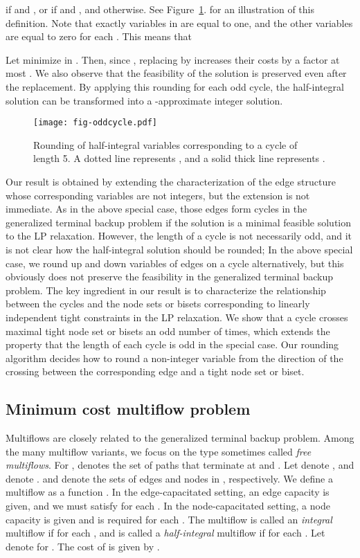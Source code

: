 \documentclass{article}
\begin{document}
if  and ,
or if  and ,
and 
 otherwise.
See Figure~\ref{fig.oddcicle}.
for an illustration of this definition.
Note that exactly  variables
in  are equal to one,
and the other  variables are equal to zero for each .
This means that 

Let  minimize  in .
Then, since ,
replacing  by 
increases their costs by a factor at most .
We also observe that 
the feasibility of the solution is preserved
even after the replacement.
By applying this rounding for each odd cycle, the half-integral solution 
can be transformed into a -approximate integer solution.

\begin{figure}[h]
\centering
\texttt{[image: fig-oddcycle.pdf]}
\caption{Rounding of half-integral variables corresponding to a cycle of length 5. 
A dotted line represents , and a solid thick line represents .}
\label{fig.oddcicle}
\end{figure}


Our result is obtained by extending 
the characterization of the edge structure whose corresponding variables are
not integers, but the extension is not immediate.
As in the above special case, those edges form cycles
in the generalized terminal backup problem if the solution is a minimal feasible solution to the LP relaxation.
However, the length of a cycle is not necessarily odd, and it is not clear how the half-integral solution should
be rounded; In the above special case, we round up and down variables of edges on a cycle alternatively, but this 
obviously does not preserve the feasibility in the generalized terminal backup problem.
The key ingredient in our result is to characterize the relationship between the cycles and the node sets or bisets
corresponding to linearly independent tight constraints in the LP relaxation.
We show that a cycle crosses maximal tight node set or bisets an odd number of times,
which extends the property that the length of each cycle is odd in the special case.
Our rounding algorithm decides how to round a non-integer variable 
from the direction of the crossing between the corresponding edge and a tight node set or biset.



\subsection{Minimum cost multiflow problem}\label{subsec.intro-multiflow}

Multiflows are
closely related to the generalized terminal backup problem.
Among the many multiflow variants, we focus on the type
sometimes called \emph{free multiflows}.
For ,
 denotes the set of paths that terminate at  and .
Let  denote ,
and  denote .
 and  denote the sets of edges and nodes in , respectively.
We define a multiflow as a function .
In the edge-capacitated setting,
an edge capacity  is given,
and we must satisfy 
 for each .
In the node-capacitated setting, a node capacity  is given
and  is required for each 
.
The multiflow  is called an \emph{integral} multiflow
if  for each ,
and is called a \emph{half-integral} multiflow
if  for each .
Let  denote  for .
The cost of  is given by
.
\end{document}
